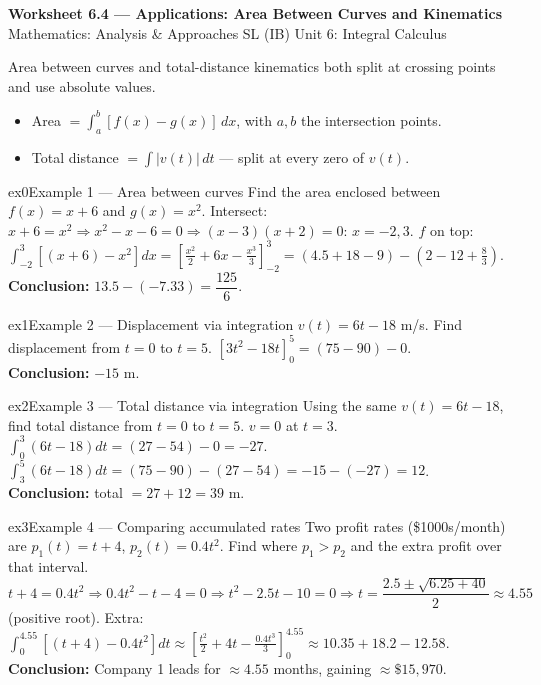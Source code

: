 \documentclass[11pt]{article}
\begin{document}
\begin{center}
{\LARGE\bfseries\color{titleblue}Worksheet 6.4 --- Applications: Area Between Curves and Kinematics}\\[2pt]
{\small Mathematics: Analysis \& Approaches SL (IB) \textperiodcentered{} Unit 6: Integral Calculus}
\end{center}

\begin{ideabox}
Area between curves and total-distance kinematics both split at crossing points and use absolute values.
\begin{itemize}[leftmargin=*,itemsep=2pt]
  \item Area $=\displaystyle\int_a^b[f(x)-g(x)]\,dx$, with $a,b$ the intersection points.
  \item Total distance $=\displaystyle\int|v(t)|\,dt$ --- split at every zero of $v(t)$.
\end{itemize}
\end{ideabox}


\begin{example}{ex0}{Example 1 --- Area between curves}
Find the area enclosed between $f(x)=x+6$ and $g(x)=x^2$.\soln
Intersect: $x+6=x^2\Rightarrow x^2-x-6=0\Rightarrow(x-3)(x+2)=0$: $x=-2,3$. $f$ on top: $\int_{-2}^3[(x+6)-x^2]dx=\left[\tfrac{x^2}2+6x-\tfrac{x^3}3\right]_{-2}^3=(4.5+18-9)-(2-12+\tfrac83)$.\\[3pt]\textbf{Conclusion:} $13.5-(-7.33)=\dfrac{125}{6}$.
\end{example}

\begin{example}{ex1}{Example 2 --- Displacement via integration}
$v(t)=6t-18$ m/s. Find displacement from $t=0$ to $t=5$.\soln
$[3t^2-18t]_0^5=(75-90)-0$.\\[3pt]\textbf{Conclusion:} $-15$ m.
\end{example}

\begin{example}{ex2}{Example 3 --- Total distance via integration}
Using the same $v(t)=6t-18$, find total distance from $t=0$ to $t=5$.\soln
$v=0$ at $t=3$. $\int_0^3(6t-18)dt=(27-54)-0=-27$. $\int_3^5(6t-18)dt=(75-90)-(27-54)=-15-(-27)=12$.\\[3pt]\textbf{Conclusion:} total $=27+12=39$ m.
\end{example}

\begin{example}{ex3}{Example 4 --- Comparing accumulated rates}
Two profit rates (\$1000s/month) are $p_1(t)=t+4$, $p_2(t)=0.4t^2$. Find where $p_1>p_2$ and the extra profit over that interval.\soln
$t+4=0.4t^2\Rightarrow0.4t^2-t-4=0\Rightarrow t^2-2.5t-10=0\Rightarrow t=\dfrac{2.5\pm\sqrt{6.25+40}}2\approx4.55$ (positive root). Extra: $\int_0^{4.55}[(t+4)-0.4t^2]dt\approx\left[\tfrac{t^2}2+4t-\tfrac{0.4t^3}3\right]_0^{4.55}\approx10.35+18.2-12.58$.\\[3pt]\textbf{Conclusion:} Company 1 leads for $\approx4.55$ months, gaining $\approx\$15{,}970$.
\end{example}
\end{document}
